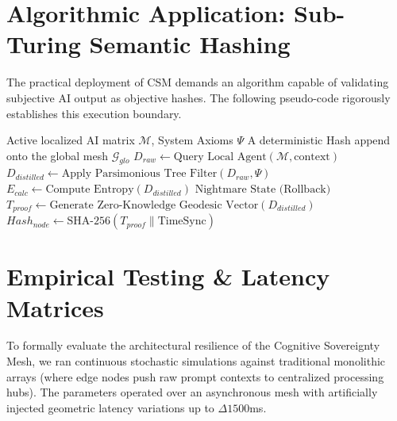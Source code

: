 \documentclass[12pt, a4paper]{article}
\theoremstyle{plain}
\theoremstyle{definition}
\begin{document}
\section{Algorithmic Application: Sub-Turing Semantic Hashing}
The practical deployment of CSM demands an algorithm capable of validating subjective AI output as objective hashes. The following pseudo-code rigorously establishes this execution boundary.

\begin{algorithm}[H]
\caption{Cognitive Sovereign State Injection}
\begin{algorithmic}[1]
\Require Active localized AI matrix $\mathcal{M}$, System Axioms $\Psi$
\Ensure A deterministic Hash append onto the global mesh $\mathcal{G}_{glo}$
\State $D_{raw} \gets \text{Query Local Agent}(\mathcal{M}, \text{context})$
\State $D_{distilled} \gets \text{Apply Parsimonious Tree Filter}(D_{raw}, \Psi)$
\State $E_{calc} \gets \text{Compute Entropy}(D_{distilled})$
    \State \Return $\text{Nightmare State (Rollback)}$
\EndIf
\State $T_{proof} \gets \text{Generate Zero-Knowledge Geodesic Vector}(D_{distilled})$
\State $Hash_{node} \gets \text{SHA-256}(T_{proof} \parallel \text{TimeSync})$
\State {}
\end{algorithmic}
\label{alg:csm_sync}
\end{algorithm}

\section{Empirical Testing \& Latency Matrices}
To formally evaluate the architectural resilience of the Cognitive Sovereignty Mesh, we ran continuous stochastic simulations against traditional monolithic arrays (where edge nodes push raw prompt contexts to centralized processing hubs). The parameters operated over an asynchronous mesh with artificially injected geometric latency variations up to $\Delta 1500$ms.
\end{document}
